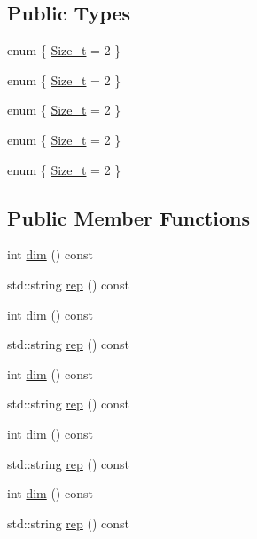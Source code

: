 \subsection*{Public Types}
\begin{DoxyCompactItemize}
\item 
enum \{ \mbox{\hyperlink{structHadron_1_1J1o2Rep_a3572b5e1998795591d516ec3bc7e9219ab3e025d42324973311b24f69bf7b64bf}{Size\+\_\+t}} = 2
 \}
\item 
enum \{ \mbox{\hyperlink{structHadron_1_1J1o2Rep_a3572b5e1998795591d516ec3bc7e9219ab3e025d42324973311b24f69bf7b64bf}{Size\+\_\+t}} = 2
 \}
\item 
enum \{ \mbox{\hyperlink{structHadron_1_1J1o2Rep_a3572b5e1998795591d516ec3bc7e9219ab3e025d42324973311b24f69bf7b64bf}{Size\+\_\+t}} = 2
 \}
\item 
enum \{ \mbox{\hyperlink{structHadron_1_1J1o2Rep_a3572b5e1998795591d516ec3bc7e9219ab3e025d42324973311b24f69bf7b64bf}{Size\+\_\+t}} = 2
 \}
\item 
enum \{ \mbox{\hyperlink{structHadron_1_1J1o2Rep_a3572b5e1998795591d516ec3bc7e9219ab3e025d42324973311b24f69bf7b64bf}{Size\+\_\+t}} = 2
 \}
\end{DoxyCompactItemize}
\subsection*{Public Member Functions}
\begin{DoxyCompactItemize}
\item 
int \mbox{\hyperlink{structHadron_1_1J1o2Rep_a2867fb4e13ae7883345606038d6b833b}{dim}} () const
\item 
std\+::string \mbox{\hyperlink{structHadron_1_1J1o2Rep_a4e049281173fb575d28821d31e36df00}{rep}} () const
\item 
int \mbox{\hyperlink{structHadron_1_1J1o2Rep_a2867fb4e13ae7883345606038d6b833b}{dim}} () const
\item 
std\+::string \mbox{\hyperlink{structHadron_1_1J1o2Rep_a4e049281173fb575d28821d31e36df00}{rep}} () const
\item 
int \mbox{\hyperlink{structHadron_1_1J1o2Rep_a2867fb4e13ae7883345606038d6b833b}{dim}} () const
\item 
std\+::string \mbox{\hyperlink{structHadron_1_1J1o2Rep_a4e049281173fb575d28821d31e36df00}{rep}} () const
\item 
int \mbox{\hyperlink{structHadron_1_1J1o2Rep_a2867fb4e13ae7883345606038d6b833b}{dim}} () const
\item 
std\+::string \mbox{\hyperlink{structHadron_1_1J1o2Rep_a4e049281173fb575d28821d31e36df00}{rep}} () const
\item 
int \mbox{\hyperlink{structHadron_1_1J1o2Rep_a2867fb4e13ae7883345606038d6b833b}{dim}} () const
\item 
std\+::string \mbox{\hyperlink{structHadron_1_1J1o2Rep_a4e049281173fb575d28821d31e36df00}{rep}} () const
\end{DoxyCompactItemize}


